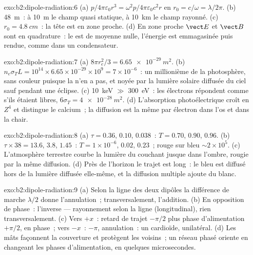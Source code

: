 \begin{solution}{exo:b2:dipole-radiation:6}
(a) $p/4\pi\varepsilon_0r^3 = \omega^2p/4\pi\varepsilon_0c^2r$ en $r_0 = c/\omega = \lambda/2\pi$. (b) \qty{48}{m}~:
à \qty{10}{m} le champ quasi statique, à \qty{10}{km} le champ rayonné. (c)
$r_0 = \qty{4.8}{cm}$~: la tête est en zone proche. (d) En zone proche $\vect E$
et $\vect B$ sont en quadrature~: le  est de moyenne nulle,
l'énergie est emmagasinée puis rendue, comme dans un condensateur.
\end{solution}

\begin{solution}{exo:b2:dipole-radiation:7}
(a) $8\pi r_e^2/3 = \qty{6.65e-29}{m^2}$. (b) $n_e\sigma_TL = 10^{14} \times 6.65 \times 10^{-29}
\times 10^9 = 7 \times 10^{-6}$~: un millionième de la photosphère, sans couleur puisque
la  n'en a pas, et noyée par la lumière solaire diffusée du ciel
sauf pendant une éclipse. (c) \qty{10}{keV} $\gg$ \qty{300}{eV}~: les électrons répondent comme
s'ils étaient libres, $6\sigma_T = \qty{4e-28}{m^2}$. (d) L'absorption photoélectrique croît en $Z^4$
et distingue le calcium~; la diffusion est la même par électron dans l'os
et dans la chair.
\end{solution}

\begin{solution}{exo:b2:dipole-radiation:8}
(a) $\tau = 0.36$, $0.10$, $0.038$~: $T = 0.70$, $0.90$, $0.96$. (b) $\tau \times 38 = 13.6$,
$3.8$, $1.45$~: $T = 1 \times 10^{-6}$, $0.02$, $0.23$~; rouge sur bleu $\sim 2 \times 10^5$. (c)
L'atmosphère terrestre courbe la lumière du couchant jusque dans l'ombre, rougie
par la même diffusion. (d) Près de l'horizon le trajet est long~: le
bleu est diffusé hors de la lumière diffusée elle-même, et la diffusion multiple
ajoute du blanc.
\end{solution}

\begin{solution}{exo:b2:dipole-radiation:9}
(a) Selon la ligne des deux dipôles la différence de marche $\lambda/2$ donne
l'annulation~; transversalement, l'addition. (b) En opposition de phase~: l'inverse ---
rayonnement selon la ligne (longitudinal), rien transversalement. (c) Vers $+x$~:
retard de trajet $-\pi/2$ plus phase d'alimentation $+\pi/2$, en phase~; vers $-x$~:
$-\pi$, annulation~: un cardioïde, unilatéral. (d) Les mâts façonnent la couverture
et protègent les voisins~; un réseau phasé oriente en changeant les phases
d'alimentation, en quelques microsecondes.
\end{solution}

